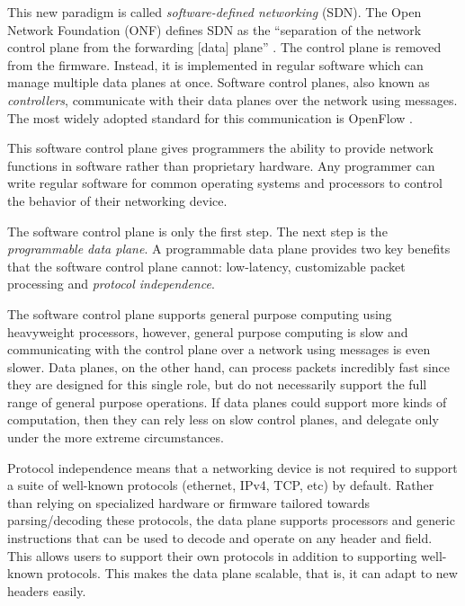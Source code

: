 This new paradigm
is called \textit{software-defined networking} (SDN). The Open Network
Foundation (ONF) defines SDN as the ``separation of the network control
plane from the forwarding [data] plane'' \cite{onf_sdn_def}.
The control plane is removed from the firmware.
Instead, it is implemented in regular software which can manage
multiple data planes at once.
Software control planes, also known as \emph{controllers}, communicate with their 
data planes over the network using messages.
The most widely adopted standard for this communication is OpenFlow \cite{openflow_spec}.

This software control plane gives programmers the ability to
provide network functions in software rather than proprietary hardware.
Any programmer can write regular software for common operating
systems and processors to control the behavior of their networking device.

The software control plane is only the first step. The next
step is the \emph{programmable data plane}. 
A programmable data plane provides
two key benefits that the software control plane cannot: low-latency, customizable packet processing and \emph{protocol independence}.


The software control plane supports general purpose computing using heavyweight
processors, however, general purpose computing is slow and communicating
with the control plane over a network using messages is even slower.
Data planes, on the other hand, can process packets incredibly fast since
they are designed for this single role, but do not necessarily support
the full range of general purpose operations.
If data planes could support more kinds of computation, then they can rely less on
slow control planes, and delegate only under the more extreme circumstances.

Protocol independence means that a networking device is not required to support
a suite of well-known protocols (ethernet, IPv4, TCP, etc) by default.
Rather than relying on specialized hardware or firmware tailored towards parsing/decoding
these protocols, the data plane supports processors
and generic instructions that can be used to decode and operate on
any header and field.
This allows users to support their own protocols in addition to
supporting well-known protocols. This makes the data plane scalable, that is, it
can adapt to new headers easily.

